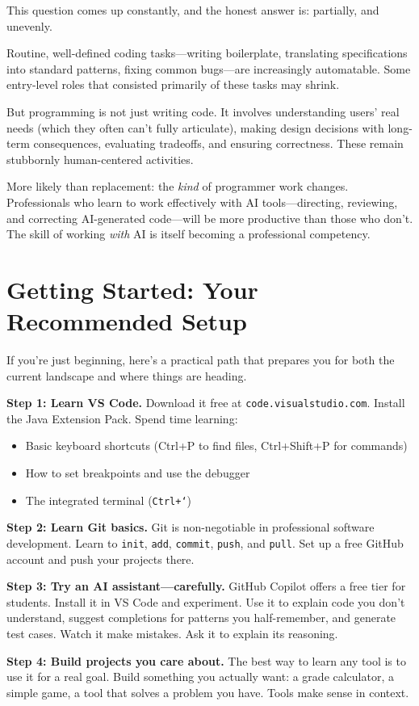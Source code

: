 \documentclass[11pt,letterpaper]{article}
\begin{document}
\begin{debatebox}
This question comes up constantly, and the honest answer is: partially, and unevenly.

Routine, well-defined coding tasks---writing boilerplate, translating specifications into standard patterns, fixing common bugs---are increasingly automatable. Some entry-level roles that consisted primarily of these tasks may shrink.

But programming is not just writing code. It involves understanding users' real needs (which they often can't fully articulate), making design decisions with long-term consequences, evaluating tradeoffs, and ensuring correctness. These remain stubbornly human-centered activities.

More likely than replacement: the \textit{kind} of programmer work changes. Professionals who learn to work effectively with AI tools---directing, reviewing, and correcting AI-generated code---will be more productive than those who don't. The skill of working \textit{with} AI is itself becoming a professional competency.
\end{debatebox}

\section{Getting Started: Your Recommended Setup}

If you're just beginning, here's a practical path that prepares you for both the current landscape and where things are heading.

\begin{tipbox}
\textbf{Step 1: Learn VS Code.}
Download it free at \texttt{code.visualstudio.com}. Install the Java Extension Pack. Spend time learning:
\begin{itemize}[itemsep=1pt]
    \item Basic keyboard shortcuts (Ctrl+P to find files, Ctrl+Shift+P for commands)
    \item How to set breakpoints and use the debugger
    \item The integrated terminal (\texttt{Ctrl+`})
\end{itemize}

\textbf{Step 2: Learn Git basics.}
Git is non-negotiable in professional software development. Learn to \texttt{init}, \texttt{add}, \texttt{commit}, \texttt{push}, and \texttt{pull}. Set up a free GitHub account and push your projects there.

\textbf{Step 3: Try an AI assistant---carefully.}
GitHub Copilot offers a free tier for students. Install it in VS Code and experiment. Use it to explain code you don't understand, suggest completions for patterns you half-remember, and generate test cases. Watch it make mistakes. Ask it to explain its reasoning.

\textbf{Step 4: Build projects you care about.}
The best way to learn any tool is to use it for a real goal. Build something you actually want: a grade calculator, a simple game, a tool that solves a problem you have. Tools make sense in context.
\end{tipbox}
\end{document}

